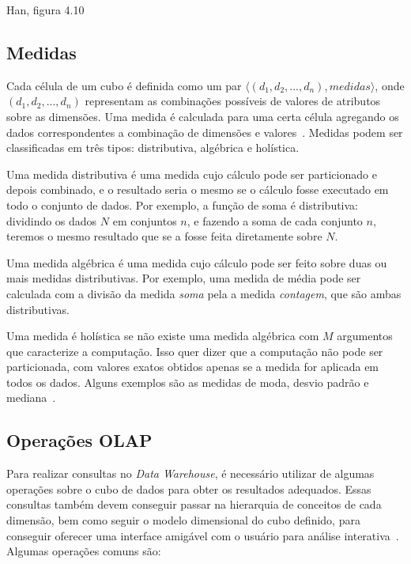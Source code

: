 {\color{red} Han, figura 4.10}

\subsection{Medidas}
\label{ch:fun:cube:measures}

Cada célula de um cubo é definida como um par $\langle (d_1, d_2, ..., d_n), medidas\rangle$, onde $(d_1, d_2, ..., d_n)$ representam as combinações possíveis de valores de atributos sobre as dimensões.
Uma medida é calculada para uma certa célula agregando os dados correspondentes a combinação de dimensões e valores~\cite{hanDataMiningConcepts2011}.
Medidas podem ser classificadas em três tipos: distributiva, algébrica e holística.

Uma medida distributiva é uma medida cujo cálculo pode ser particionado e depois combinado, e o resultado seria o mesmo se o cálculo fosse executado em todo o conjunto de dados.
Por exemplo, a função de soma é distributiva: dividindo os dados $N$ em conjuntos $n$, e fazendo a soma de cada conjunto $n$, teremos o mesmo resultado que se a fosse feita diretamente sobre $N$.

Uma medida algébrica é uma medida cujo cálculo pode ser feito sobre duas ou mais medidas distributivas.
Por exemplo, uma medida de média pode ser calculada com a divisão da medida \textit{soma} pela a medida \textit{contagem}, que são ambas distributivas.

Uma medida é holística se não existe uma medida algébrica com $M$ argumentos que caracterize a computação.
Isso quer dizer que a computação não pode ser particionada, com valores exatos obtidos apenas se a medida for aplicada em todos os dados.
Alguns exemplos são as medidas de moda, desvio padrão e mediana~\cite{hanDataMiningConcepts2011}.

\subsection{Operações OLAP}
\label{ch:fun:cube:olapops}

Para realizar consultas no \textit{Data Warehouse}, é necessário utilizar de algumas operações sobre o cubo de dados para obter os resultados adequados.
Essas consultas também devem conseguir passar na hierarquia de conceitos de cada dimensão, bem como seguir o modelo dimensional do cubo definido, para conseguir oferecer uma interface amigável com o usuário para análise interativa~\cite{hanDataMiningConcepts2011}.
Algumas operações comuns são:

